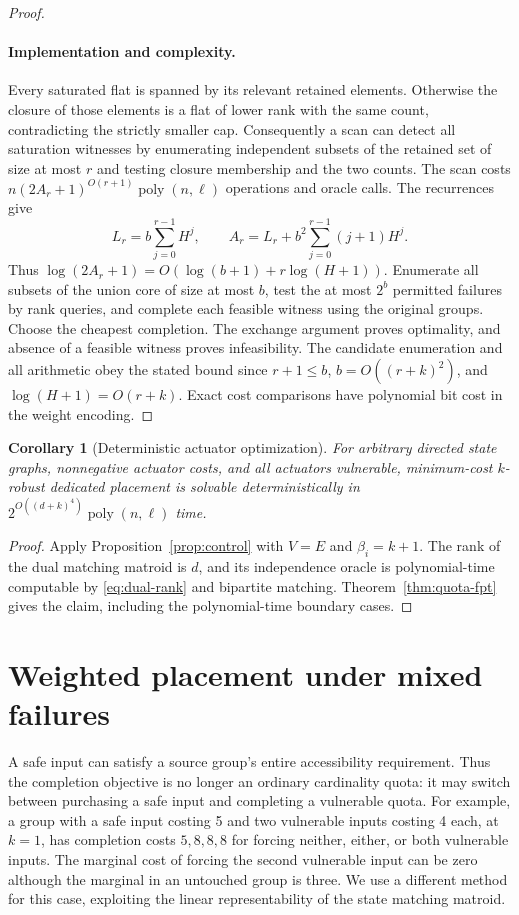 \documentclass[11pt]{article}
\newtheorem{corollary}[theorem]{Corollary}
\theoremstyle{definition}
\theoremstyle{remark}\newtheorem{remark}[theorem]{Remark}
\begin{document}
\begin{proof}
\paragraph{Implementation and complexity.}
Every saturated flat is spanned by its relevant retained
elements. Otherwise the closure of those elements is a flat
of lower rank with the same count, contradicting the strictly
smaller cap. Consequently a scan can detect all saturation
witnesses by enumerating independent subsets of the retained
set of size at most $r$ and testing closure membership and
the two counts. The scan costs
$n(2A_r+1)^{O(r+1)}\operatorname{poly}(n,\ell)$ operations
and oracle calls. The recurrences give
\[
 L_r=b\sum_{j=0}^{r-1}H^j,\qquad
 A_r=L_r+b^2\sum_{j=0}^{r-1}(j+1)H^j .
\]
Thus $\log(2A_r+1)=O(\log(b+1)+r\log(H+1))$.
Enumerate all subsets of the union core of size at most $b$,
test the at most $2^b$ permitted failures by rank queries, and
complete each feasible witness using the original groups.
Choose the cheapest completion. The exchange argument proves
optimality, and absence of a feasible witness proves infeasibility.
The candidate enumeration and all arithmetic obey the stated
bound since $r+1\le b$, $b=O((r+k)^2)$, and
$\log(H+1)=O(r+k)$. Exact cost comparisons have polynomial
bit cost in the weight encoding.
\end{proof}

\begin{corollary}[Deterministic actuator optimization]\label{cor:general-control-fpt}
For arbitrary directed state graphs, nonnegative actuator costs,
and all actuators vulnerable, minimum-cost $k$-robust dedicated
placement is solvable deterministically in
$2^{O((d+k)^4)}\operatorname{poly}(n,\ell)$ time.
\end{corollary}
\begin{proof}
Apply Proposition~\ref{prop:control} with $V=E$ and
$\beta_i=k+1$. The rank of the dual matching matroid is $d$,
and its independence oracle is polynomial-time computable by
\eqref{eq:dual-rank} and bipartite matching.
Theorem~\ref{thm:quota-fpt} gives the claim, including the
polynomial-time boundary cases.
\end{proof}

\section{Weighted placement under mixed failures}\label{sec:mixed}
A safe input can satisfy a source group's entire accessibility
requirement. Thus the completion objective is no longer an ordinary
cardinality quota: it may switch between purchasing a safe input
and completing a vulnerable quota. For example, a group with a
safe input costing 5 and two vulnerable inputs costing 4 each,
at $k=1$, has completion costs $5,8,8,8$ for forcing neither,
either, or both vulnerable inputs. The marginal cost of forcing
the second vulnerable input can be zero although the marginal
in an untouched group is three. We use a different method for
this case, exploiting the linear representability of the state
matching matroid.
\end{document}
